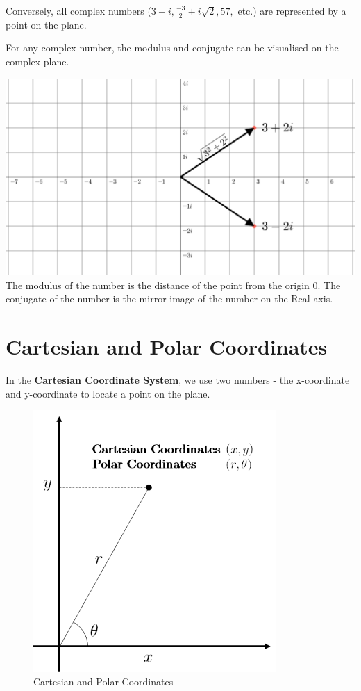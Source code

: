 \documentclass[
  14pt,
]{extarticle}
\renewenvironment{quote}{\begin{myquote}}{\end{myquote}}
\begin{document}
Conversely, all complex numbers (\(3+i, \frac{-3}{2}+i\sqrt2, 57,\)
etc.) are represented by a point on the plane.

\begin{quote}
For any complex number, the modulus and conjugate can be visualised on
the complex plane.

\includegraphics{../images/2022-05-31-15-27-09.png} The modulus of the
number is the distance of the point from the origin \(0\). The conjugate
of the number is the mirror image of the number on the Real axis.
\end{quote}

\hypertarget{cartesian-and-polar-coordinates}{%
\section{Cartesian and Polar
Coordinates}\label{cartesian-and-polar-coordinates}}

In the \textbf{Cartesian Coordinate System}, we use two numbers - the
x-coordinate and y-coordinate to locate a point on the plane.

\begin{figure}
\centering
\includegraphics[width=3.64583in,height=\textheight]{../images/2022-05-31-17-15-48.png}
\caption{Cartesian and Polar Coordinates}
\end{figure}
\end{document}
